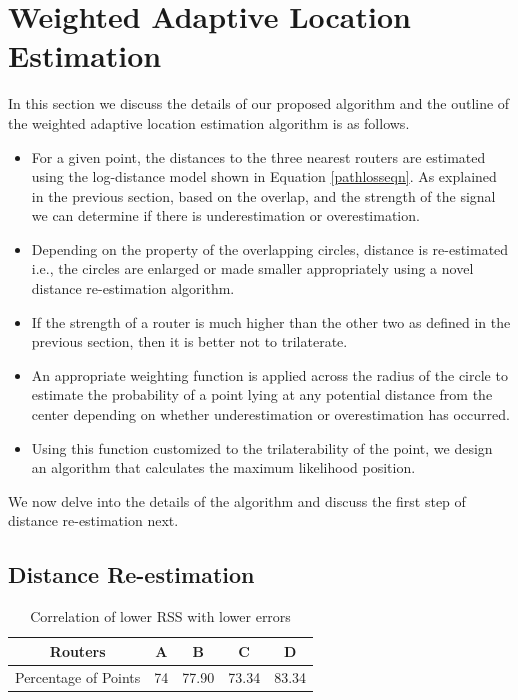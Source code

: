 \documentclass[twocolumn]{svjour3}
\begin{document}
\section{\textbf{Weighted Adaptive Location Estimation}}
In this section we discuss the details of our proposed algorithm and the outline of the weighted adaptive location estimation algorithm is as follows. 
\begin{itemize}
   \item For a given point, the distances to the three nearest routers are estimated using the log-distance model shown in Equation \ref{pathlosseqn}. As explained in the previous section, based on the overlap, and the strength of the signal we can determine if there is underestimation or overestimation. 
  \item Depending on the property of the overlapping circles, distance is re-estimated i.e., the circles are enlarged or made smaller appropriately using a novel distance re-estimation algorithm.
  \item If the strength of a router is much higher than the other two as defined in the previous section, then it is better not to trilaterate.
  \item An appropriate weighting function is applied across the radius of the circle to estimate the probability of a point lying at any potential distance from the center depending on whether underestimation or overestimation has occurred. 
  \item Using this function customized to the trilaterability of the point, we design an algorithm that calculates the maximum likelihood position.
\end{itemize}
We now delve into the details of the algorithm and discuss the first step of distance re-estimation next. 

\subsection{\textbf{Distance Re-estimation}}

\begin{table}
\centering
\begin{tabular}{ | c| c| c| c| c| } 
\hline
Routers &A &B &C &D \\
\hline
Percentage of Points & 74 & 77.90 & 73.34 & 83.34 \\
\hline
\end{tabular}
\centering
\caption{Correlation of lower RSS with lower errors}
\label{lower-rss}
\end{table}
\end{document}
